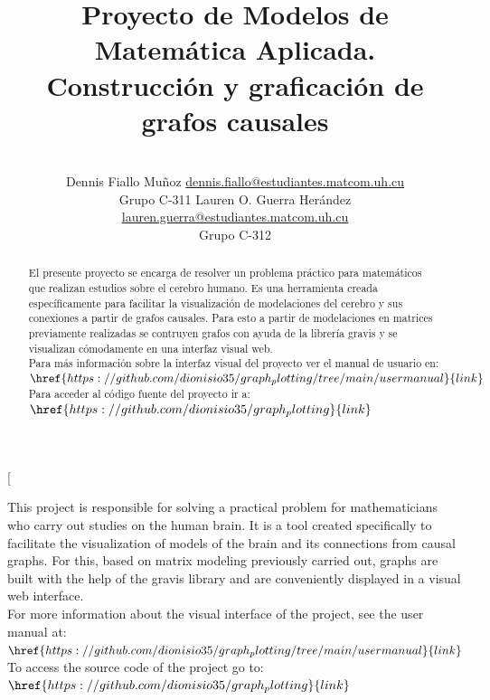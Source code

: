 \documentclass[a4paper,10pt,twocolumn]{article}
\title{Proyecto de Modelos de Matemática Aplicada. \\Construcción y graficación de grafos causales}
\author{\\
\name Dennis Fiallo Muñoz \email \href{mailto: dennis.fiallo@estudiantes.matcom.uh.cu}{dennis.fiallo@estudiantes.matcom.uh.cu}
	\\ \addr Grupo C-311 \AND
\name Lauren O. Guerra Herández \email \href{mailto:lauren.guerra@estudiantes.matcom.uh.cu}{lauren.guerra@estudiantes.matcom.uh.cu}
  \\ \addr Grupo C-312}
\begin{document}
\twocolumn[

\maketitle


\begin{abstract}

El presente proyecto se encarga de resolver un problema práctico para matemáticos que realizan estudios sobre el cerebro humano. Es una herramienta creada específicamente para facilitar la visualización de modelaciones del cerebro y sus conexiones a partir de grafos causales. Para esto a partir de modelaciones en matrices previamente realizadas se contruyen grafos con ayuda de la librería gravis y se visualizan cómodamente en una interfaz visual web.\\
Para más información sobre la interfaz visual del proyecto ver el manual de usuario en: $\href{https://github.com/dionisio35/graph_plotting/tree/main/user manual}{link}$\\
Para acceder al código fuente del proyecto ir a: $\href{https://github.com/dionisio35/graph_plotting}{link}$


\end{abstract}

\vspace{0.9cm}

\begin{enabstract}

This project is responsible for solving a practical problem for mathematicians who carry out studies on the human brain. It is a tool created specifically to facilitate the visualization of models of the brain and its connections from causal graphs. For this, based on matrix modeling previously carried out, graphs are built with the help of the gravis library and are conveniently displayed in a visual web interface.
\\
For more information about the visual interface of the project, see the user manual at: $\href{https://github.com/dionisio35/graph_plotting/tree/main/user manual}{link}$\\
To access the source code of the project go to:  $\href{https://github.com/dionisio35/graph_plotting}{link}$
\end{enabstract}
\end{document}

